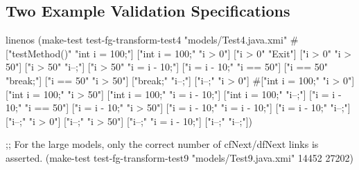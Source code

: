 \documentclass[submission]{eptcs}
\begin{document}
\subsection{Two Example Validation Specifications}
\label{sec:two-example-valid}

\begin{clojurecode*}{linenos}
(make-test test-fg-transform-test4 "models/Test4.java.xmi"
           #{["testMethod()" "int i = 100;"]
             ["int i = 100;" "i > 0"]
             ["i > 0"        "Exit"]
             ["i > 0"        "i > 50"]
             ["i > 50"       "i--;"]
             ["i > 50"       "i = i - 10;"]
             ["i = i - 10;"  "i == 50"]
             ["i == 50"      "break;"]
             ["i == 50"      "i > 50"]
             ["break;"       "i--;"]
             ["i--;"         "i > 0"]}
           #{["int i = 100;" "i > 0"]
             ["int i = 100;" "i > 50"]
             ["int i = 100;" "i = i - 10;"]
             ["int i = 100;" "i--;"]
             ["i = i - 10;"  "i == 50"]
             ["i = i - 10;"  "i > 50"]
             ["i = i - 10;"  "i = i - 10;"]
             ["i = i - 10;"  "i--;"]
             ["i--;"         "i > 0"]
             ["i--;"         "i > 50"]
             ["i--;"         "i = i - 10;"]
             ["i--;"         "i--;"]})

;; For the large models, only the correct number of cfNext/dfNext links is asserted.
(make-test test-fg-transform-test9 "models/Test9.java.xmi" 14452 27202)
\end{clojurecode*}
\end{document}
